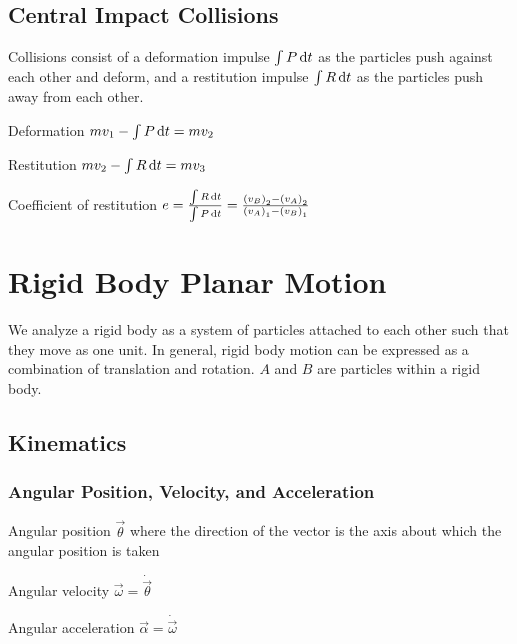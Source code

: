 \documentclass{article}
\begin{document}
\subsection{Central Impact Collisions}
\label{sec:particle-collisions}

Collisions consist of a deformation impulse \(\int P \dif{t}\) as the particles push against each
other and deform, and a restitution impulse \(\int R \dif{t}\) as the particles push away from each
other.

\begin{description*}
\item[Deformation]
  \(mv_1 - \int P \dif{t} = mv_2\)
\item[Restitution]
  \(mv_2 - \int R \dif{t} = mv_3\)
\item[Coefficient of restitution]
  \(e = \frac{\int R \dif{t}}{\int P \dif{t}} = \frac{{(v_B)}_2 - {(v_A)}_2}{{(v_A)}_1 - {(v_B)}_1}\)
\end{description*}

\section{Rigid Body Planar Motion}
\label{sec:rigid-body-motion}

We analyze a rigid body as a system of particles attached to each other such that they move as one
unit. In general, rigid body motion can be expressed as a combination of translation and
rotation. $A$ and $B$ are particles within a rigid body.

\subsection{Kinematics}
\label{sec:rigid-body-kinematics}

\subsubsection{Angular Position, Velocity, and Acceleration}

\begin{description*}
\item[Angular position] \(\vec\theta\) where the direction of the vector is the axis about which the
  angular position is taken
\item[Angular velocity]
  \(\vec\omega = \dot{\vec\theta}\)
\item[Angular acceleration]
  \(\vec\alpha = \dot{\vec\omega}\)
\end{description*}
\end{document}
